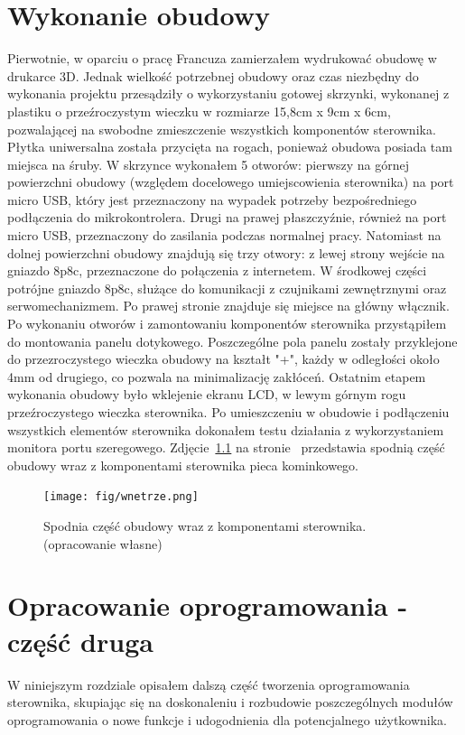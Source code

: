 \documentclass[11pt]{report}
\begin{document}
 \chapter{Wykonanie obudowy}\label{ch:obudowa}
 Pierwotnie, w oparciu o pracę Francuza \cite{Frence2014} zamierzałem wydrukować obudowę w  drukarce 3D. Jednak wielkość potrzebnej obudowy oraz czas niezbędny do wykonania projektu przesądziły o wykorzystaniu gotowej skrzynki, wykonanej z plastiku o przeźroczystym wieczku w rozmiarze 15,8cm x 9cm x 6cm, pozwalającej na swobodne zmieszczenie wszystkich komponentów sterownika. Płytka uniwersalna została przycięta na rogach, ponieważ obudowa posiada tam miejsca na śruby. W skrzynce wykonałem 5 otworów: pierwszy na górnej powierzchni obudowy (względem docelowego umiejscowienia sterownika) na port micro USB, który jest przeznaczony na wypadek potrzeby bezpośredniego podłączenia do mikrokontrolera. Drugi na prawej płaszczyźnie, również na port micro USB, przeznaczony do zasilania podczas normalnej pracy. Natomiast na dolnej powierzchni obudowy znajdują się trzy otwory: z lewej strony wejście na gniazdo 8p8c, przeznaczone do połączenia z internetem. W środkowej części potrójne gniazdo 8p8c, służące do komunikacji z czujnikami zewnętrznymi oraz serwomechanizmem. Po prawej stronie znajduje się miejsce na główny włącznik.
 Po wykonaniu otworów i zamontowaniu komponentów sterownika przystąpiłem do montowania panelu dotykowego. Poszczególne pola panelu zostały przyklejone do przezroczystego wieczka obudowy na kształt "+", każdy w odległości około 4mm od drugiego, co pozwala na minimalizację zakłóceń.
 Ostatnim etapem wykonania obudowy było wklejenie ekranu LCD, w lewym górnym rogu przeźroczystego wieczka sterownika.
 Po umieszczeniu w obudowie i podłączeniu wszystkich elementów sterownika dokonałem testu działania z wykorzystaniem monitora portu szeregowego.
   Zdjęcie~\ref{fig:wnetrze} na stronie~\pageref{fig:wnetrze} przedstawia spodnią część obudowy wraz z komponentami sterownika pieca kominkowego.
\begin{figure}[ht]
\centering
\texttt{[image: fig/wnetrze.png]}
\caption{Spodnia część obudowy wraz z komponentami sterownika. (opracowanie własne)}
\label{fig:wnetrze}
\end{figure}
 
 \chapter{Opracowanie oprogramowania - część druga}\label{ch:oprog:2}
 W niniejszym rozdziale opisałem dalszą część tworzenia oprogramowania sterownika, skupiając się na doskonaleniu i rozbudowie poszczególnych modułów oprogramowania o nowe funkcje i udogodnienia dla potencjalnego użytkownika.
\end{document}
